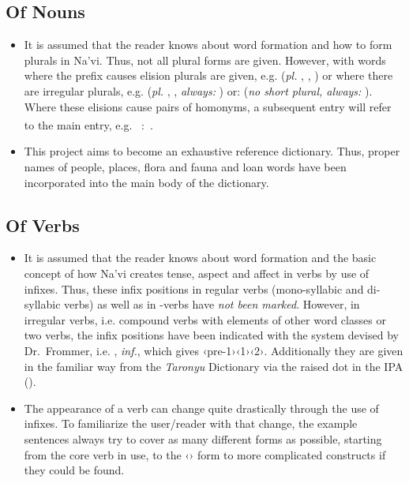 \subsection*{Of Nouns}

\begin{itemize}

	\item It is assumed that the reader knows about word formation and how to form plurals in Na'vi. Thus, not all plural forms are given. However, with words where the prefix causes elision plurals are given, e.g.  (\emph{pl.} , , ) or where there are irregular plurals, e.g.  (\emph{pl.} , , \emph{always:} ) or:  (\emph{no short plural, always:} ). Where these elisions cause pairs of homonyms, a subsequent entry will refer to the main entry, e.g. \textsuperscript{}~:~.

	\item This project aims to become an exhaustive reference dictionary. Thus, proper names of people, places, flora and fauna and loan words have been incorporated into the main body of the dictionary.

\end{itemize}

\subsection*{Of Verbs}

\begin{itemize}

	\item It is assumed that the reader knows about word formation and the basic concept of how Na'vi creates tense, aspect and affect in verbs by use of infixes. Thus, these infix positions in regular verbs (mono\hyp{}syllabic and di\hyp{}syllabic verbs) as well as in \hyp{}verbs have \emph{not been marked}. However, in irregular verbs, i.e. compound verbs with elements of other word classes or two verbs, the infix positions have been indicated with the system devised by Dr.~Frommer, i.e. , \emph{inf.}, which gives ‹pre-1›‹1›‹2›. Additionally they are given in the familiar way from the \emph{Taronyu} Dictionary via the raised dot in the IPA ().

	\item The appearance of a verb can change quite drastically through the use of infixes. To familiarize the user\slash reader with that change, the example sentences always try to cover as many different forms as possible, starting from the core verb in use, to the ‹› form to more complicated constructs if they could be found.
	
\end{itemize}

